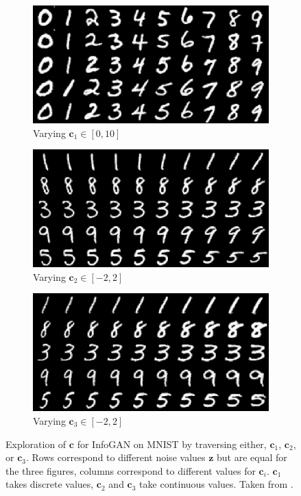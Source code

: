 \begin{figure}
    \centering
    \begin{subfigure}{.33\textwidth}
        \centering
        \includegraphics[width=.8\textwidth]{images/infogan_c1.png}
        \caption{Varying $\bm{c}_1 \in [0, 10]$}
    \end{subfigure}%
    \begin{subfigure}{.33\textwidth}
        \centering
        \includegraphics[width=.8\textwidth]{images/infogan_c2.png}
        \caption{Varying $\bm{c}_2 \in [-2, 2]$}
    \end{subfigure}
    \begin{subfigure}{.33\textwidth}
        \centering
        \includegraphics[width=.8\textwidth]{images/infogan_c3.png}
        \caption{Varying $\bm{c}_3 \in [-2, 2]$}
    \end{subfigure}
    \caption[InfoGAN latent space traversal]{Exploration of $\bm{c}$ for InfoGAN on MNIST by traversing either, $\bm{c}_1$, $\bm{c}_2$, or $\bm{c}_3$. Rows correspond to different noise values $\bm{z}$ but are equal for the three figures, columns correspond to different values for $\bm{c}_i$. $\bm{c}_1$ takes discrete values, $\bm{c}_2$ and $\bm{c}_3$ take continuous values. Taken from \citet{chen2016infogan}.}
    \label{fig:infogan}
\end{figure}

